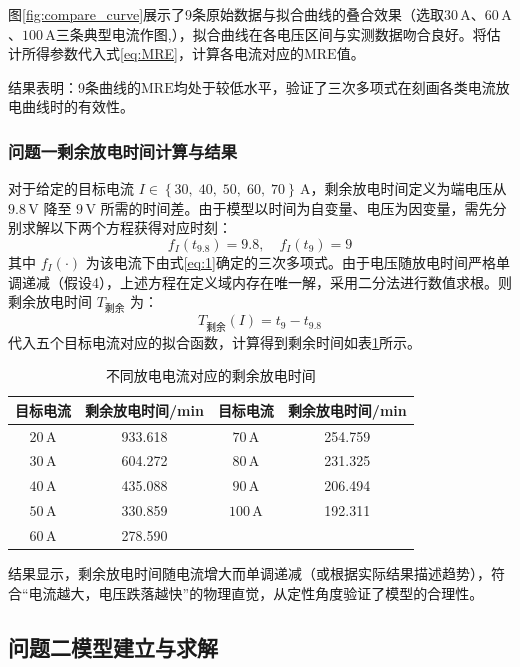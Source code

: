 \documentclass[withoutpreface,bwprint]{cumcmthesis} %
\begin{document}
图\ref{fig:compare_curve}展示了9条原始数据与拟合曲线的叠合效果（选取$30\,\text{A}$、$60\,\text{A}$、$100\,\text{A}$三条典型电流作图,），拟合曲线在各电压区间与实测数据吻合良好。将估计所得参数代入式\eqref{eq:MRE}，计算各电流对应的$\text{MRE}$值。

结果表明：9条曲线的$\text{MRE}$均处于较低水平，验证了三次多项式在刻画各类电流放电曲线时的有效性。
\subsubsection{问题一剩余放电时间计算与结果}
对于给定的目标电流 $I\in \left\{30,\; 40,\; 50,\; 60,\; 70\right\}\,\text{A}$，剩余放电时间定义为端电压从 $9.8\,\text{V}$ 降至 $9\,\text{V}$ 所需的时间差。由于模型以时间为自变量、电压为因变量，需先分别求解以下两个方程获得对应时刻：
\begin{equation}
f_{I}\left(t_{9.8}\right)=9.8,\quad f_{I}\left(t_{9}\right)=9
\label{eq:4}
\end{equation}
其中 $f_{I}\left(\cdot \right)$ 为该电流下由式\eqref{eq:1}确定的三次多项式。由于电压随放电时间严格单调递减（假设4），上述方程在定义域内存在唯一解，采用二分法进行数值求根。则剩余放电时间 $T_{\text{剩余}}$ 为：
\begin{equation}
T_{\text{剩余}}\left(I\right)=t_{9}-t_{9.8}
\label{eq:5}
\end{equation}
代入五个目标电流对应的拟合函数，计算得到剩余时间如表\ref{tab:3}所示。
\begin{table}[htbp]
\setlength{\tabcolsep}{16pt} %
\centering
\caption{不同放电电流对应的剩余放电时间}
\label{tab:3}
\begin{tabular}{cc|cc}
\toprule
目标电流 & 剩余放电时间/min & 目标电流 & 剩余放电时间/min \\
\midrule
$20\,\text{A}$ & 933.618 & $70\,\text{A}$ & 254.759 \\
$30\,\text{A}$ & 604.272 & $80\,\text{A}$ & 231.325 \\
$40\,\text{A}$ & 435.088 & $90\,\text{A}$ & 206.494 \\
$50\,\text{A}$ & 330.859 & $100\,\text{A}$ & 192.311 \\
$60\,\text{A}$ & 278.590 & & \\
\bottomrule
\end{tabular}
\end{table}
结果显示，剩余放电时间随电流增大而单调递减（或根据实际结果描述趋势），符合“电流越大，电压跌落越快”的物理直觉，从定性角度验证了模型的合理性。
\subsection{问题二模型建立与求解}
\end{document}

